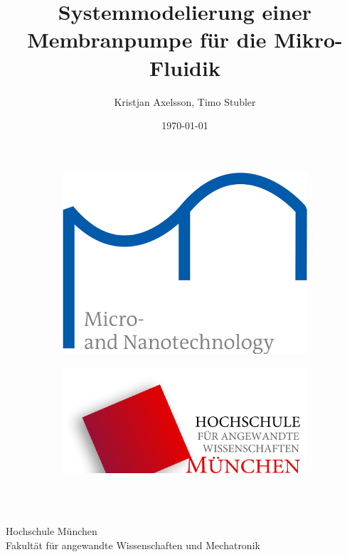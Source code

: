 \documentclass[fontsize=12pt, a4paper]{scrartcl}
\title{Systemmodelierung einer Membranpumpe für die Mikro-Fluidik}
\author{Kristjan Axelsson, Timo Stubler}
\date{\today}
\begin{document}
\begin{titlingpage}
\begin{center}
\begin{figure}[H]
    \centering
    \begin{subfigure}[B]{0.2\textwidth}
        \includegraphics[width=\textwidth, valign=t]{bilder/Logo_MNM_EN_Farbe_ohneHM (1).png}
    \end{subfigure}
    \begin{subfigure}[B]{0.45\textwidth}
        \includegraphics[width=\textwidth, valign=t]{bilder/Hochschule_Muenchen_Logo.png}
    \end{subfigure}
\end{figure}
\setcounter{figure}{0}
\vspace{2cm}
\begin{large} 
\textbf{\thetitle} \\
\end{large}
\vspace{1cm}
\theauthor\\
\vspace{1cm}
Hochschule München \\
Fakultät für angewandte Wissenschaften und Mechatronik \\
\vspace{1cm}
\thedate
\end{center}
\end{titlingpage}
\end{document}
